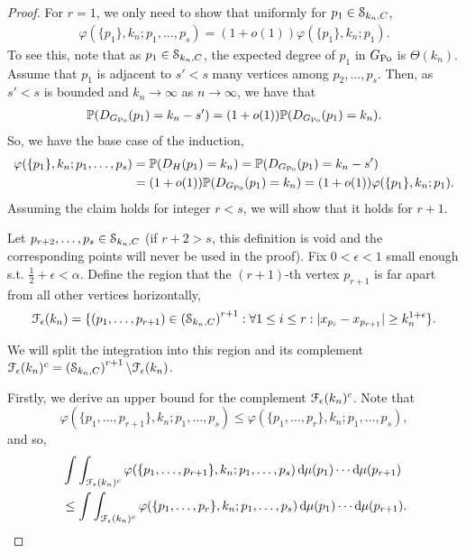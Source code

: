 \begin{proof}
For $r=1$, we only need to show that uniformly for $p_1 \in \mathcal{S}_{k_n,C}$,
\begin{align*}
\varphi(\{p_1\}, k_n ;p_1,\dots,p_s) = (1+o(1))\varphi(\{p_1\}, k_n ;p_1).
\end{align*}
To see this, note that as $p_1\in \mathcal{S}_{k_n,C}$, the expected degree of $p_1$ in $G_{{\mathrm{Po}}}$ is $\Theta(k_n)$. Assume that $p_1$ is adjacent to $s'<s$ many vertices among $p_2,\dots,p_s$. Then, as $s'<s$ is bounded and $k_n \rightarrow \infty$ as $n\rightarrow \infty$,  we have that
\begin{align*}
\mathbb{P}(D_{G_{{\mathrm{Po}}}}(p_1)=k_n-s') = (1+o(1))\mathbb{P}(D_{G_{{\mathrm{Po}}}}(p_1)=k_n).
\end{align*}
So, we have the base case of the induction,
\begin{align*}
\varphi(\{p_1\}, k_n ;p_1,\dots,p_s)&=\mathbb{P}(D_H(p_1)=k_n)
= \mathbb{P}(D_{G_{{\mathrm{Po}}}}(p_1)=k_n-s')\\
&= (1+o(1))\mathbb{P}(D_{G_{{\mathrm{Po}}}}(p_1)=k_n)=(1+o(1))\varphi(\{p_1\}, k_n ;p_1).
\end{align*}
Assuming the claim holds for integer $r <s$, we will show that it holds for $r+1$.

Let $p_{r+2},\dots,p_s\in \mathcal{S}_{k_n,C}$ (if $r+2>s$, this definition is void and the corresponding points will never be used in the proof).
Fix $0<\epsilon<1$ small enough s.t. $\frac{1}{2}+\epsilon<\alpha$. Define the region that the $(r+1)$-th vertex $p_{r+1}$ is far apart from all other vertices horizontally,
$$\mathcal{F}_\epsilon(k_n)=\{(p_1,\dots,p_{r+1}) \in \left(\mathcal{S}_{k_n,C}\right)^{r+1}: \forall 1\leq i \leq r: |x_{p_i}-x_{p_{r+1}}|\geq k_n^{1+\epsilon}\}.$$

We will split the integration into this region and its complement $\mathcal{F}_\epsilon(k_n)^c = \left(\mathcal{S}_{k_n,C}\right)^{r+1} \backslash \mathcal{F}_\epsilon(k_n)$.

Firstly, we derive an upper bound for the complement $\mathcal{F}_\epsilon(k_n)^c$. Note that 
\[
	\varphi(\{p_1,\dots,p_{r+1}\}, k_n ;p_1,\dots,p_s) \leq \varphi(\{p_1,\dots,p_r\}, k_n ;p_1,\dots,p_s),
\]
and so,
\begin{align*}
	&\int \int_{\mathcal{F}_\epsilon(k_n)^c} \varphi(\{p_1,\dots,p_{r+1}\}, k_n ;p_1,\dots,p_s)
		\operatorname{\mathrm{d}\hspace{-2pt}} \mu(p_1) \cdots \operatorname{\mathrm{d}\hspace{-2pt}} \mu(p_{r+1})\\
	&\leq \int \int_{\mathcal{F}_\epsilon(k_n)^c} \varphi(\{p_1,\dots,p_r\}, k_n ;p_1,\dots,p_s)
		\operatorname{\mathrm{d}\hspace{-2pt}} \mu(p_1) \cdots \operatorname{\mathrm{d}\hspace{-2pt}} \mu(p_{r+1}).
\end{align*}


\end{proof}
